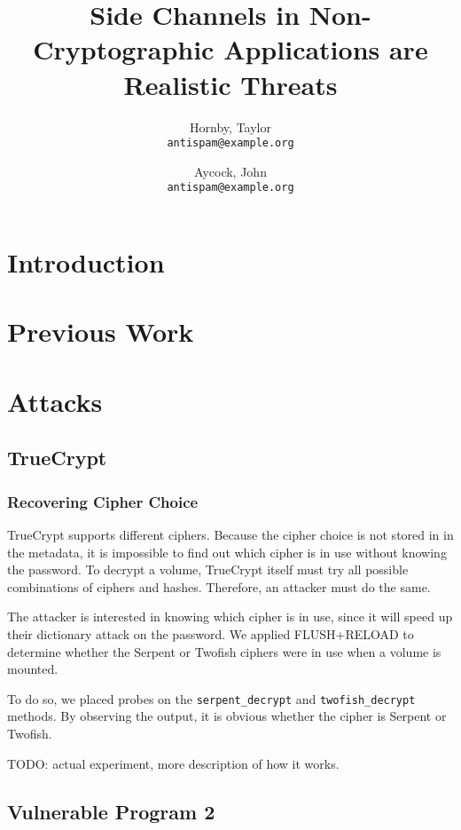 \documentclass[letterpaper,10pt]{article} %
\title{Side Channels in Non-Cryptographic Applications are Realistic Threats}
\author{Hornby, Taylor\\
    \texttt{antispam@example.org}
    \and
    Aycock, John\\
    \texttt{antispam@example.org}
}
\begin{document}
\maketitle

\begin{abstract}
\end{abstract}

\section{Introduction}

\section{Previous Work}

\section{Attacks}

\subsection{TrueCrypt}

\subsubsection{Recovering Cipher Choice}

TrueCrypt supports different ciphers. Because the cipher choice is not stored in
in the metadata, it is impossible to find out which cipher is in use without
knowing the password. To decrypt a volume, TrueCrypt itself must try all
possible combinations of ciphers and hashes. Therefore, an attacker must do the
same.

The attacker is interested in knowing which cipher is in use, since it will
speed up their dictionary attack on the password. We applied FLUSH+RELOAD to
determine whether the Serpent or Twofish ciphers were in use when a volume is
mounted.

To do so, we placed probes on the \texttt{serpent\_decrypt} and
\texttt{twofish\_decrypt} methods. By observing the output, it is obvious
whether the cipher is Serpent or Twofish.

TODO: actual experiment, more description of how it works.

\subsection{Vulnerable Program 2}
\end{document}

